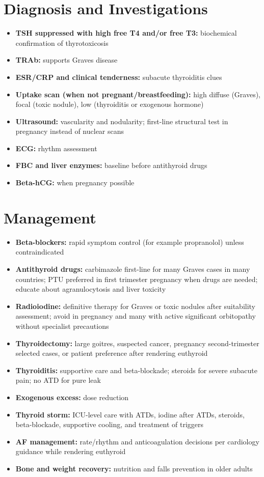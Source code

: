 \section*{Diagnosis and Investigations}
\begin{itemize}
    \item \textbf{TSH suppressed with high free T4 and/or free T3:} biochemical confirmation of thyrotoxicosis
    \item \textbf{TRAb:} supports Graves disease
    \item \textbf{ESR/CRP and clinical tenderness:} subacute thyroiditis clues
    \item \textbf{Uptake scan (when not pregnant/breastfeeding):} high diffuse (Graves), focal (toxic nodule), low (thyroiditis or exogenous hormone)
    \item \textbf{Ultrasound:} vascularity and nodularity; first-line structural test in pregnancy instead of nuclear scans
    \item \textbf{ECG:} rhythm assessment
    \item \textbf{FBC and liver enzymes:} baseline before antithyroid drugs
    \item \textbf{Beta-hCG:} when pregnancy possible
\end{itemize}

\section*{Management}
\begin{itemize}
    \item \textbf{Beta-blockers:} rapid symptom control (for example propranolol) unless contraindicated
    \item \textbf{Antithyroid drugs:} carbimazole first-line for many Graves cases in many countries; PTU preferred in first trimester pregnancy when drugs are needed; educate about agranulocytosis and liver toxicity
    \item \textbf{Radioiodine:} definitive therapy for Graves or toxic nodules after suitability assessment; avoid in pregnancy and many with active significant orbitopathy without specialist precautions
    \item \textbf{Thyroidectomy:} large goitres, suspected cancer, pregnancy second-trimester selected cases, or patient preference after rendering euthyroid
    \item \textbf{Thyroiditis:} supportive care and beta-blockade; steroids for severe subacute pain; no ATD for pure leak
    \item \textbf{Exogenous excess:} dose reduction
    \item \textbf{Thyroid storm:} ICU-level care with ATDs, iodine after ATDs, steroids, beta-blockade, supportive cooling, and treatment of triggers
    \item \textbf{AF management:} rate/rhythm and anticoagulation decisions per cardiology guidance while rendering euthyroid
    \item \textbf{Bone and weight recovery:} nutrition and falls prevention in older adults
\end{itemize}

